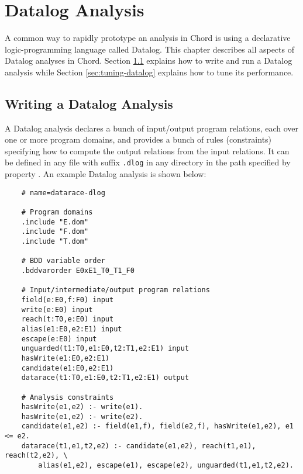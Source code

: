 \chapter{Datalog Analysis}
\label{chap:datalog}

A common way to rapidly prototype an analysis in Chord is using a declarative
logic-programming language called Datalog.  This chapter describes all aspects
of Datalog analyses in Chord.  Section \ref{sec:writing-datalog} explains how to
write and run a Datalog analysis while Section \ref{sec:tuning-datalog} explains how
to tune its performance.

\section{Writing a Datalog Analysis}
\label{sec:writing-datalog}

A Datalog analysis declares a bunch of input/output program relations, each over
one or more program domains, and provides a bunch of rules (constraints)
specifying how to compute the output relations from the input relations.  It can
be defined in any file with suffix {\tt .dlog} in any directory in the path
specified by property .  An example Datalog
analysis is shown below:

\texonly{\newpage}

\begin{framed}
{\small
\begin{verbatim}
    # name=datarace-dlog

    # Program domains
    .include "E.dom"
    .include "F.dom"
    .include "T.dom"

    # BDD variable order
    .bddvarorder E0xE1_T0_T1_F0

    # Input/intermediate/output program relations
    field(e:E0,f:F0) input
    write(e:E0) input
    reach(t:T0,e:E0) input
    alias(e1:E0,e2:E1) input
    escape(e:E0) input
    unguarded(t1:T0,e1:E0,t2:T1,e2:E1) input
    hasWrite(e1:E0,e2:E1)
    candidate(e1:E0,e2:E1) 
    datarace(t1:T0,e1:E0,t2:T1,e2:E1) output

    # Analysis constraints
    hasWrite(e1,e2) :- write(e1).
    hasWrite(e1,e2) :- write(e2).
    candidate(e1,e2) :- field(e1,f), field(e2,f), hasWrite(e1,e2), e1 <= e2.
    datarace(t1,e1,t2,e2) :- candidate(e1,e2), reach(t1,e1), reach(t2,e2), \
        alias(e1,e2), escape(e1), escape(e2), unguarded(t1,e1,t2,e2).
\end{verbatim}
}
\end{framed}

